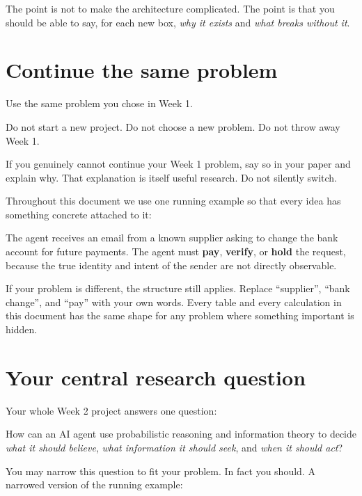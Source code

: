 \documentclass[11pt,a4paper]{article}
\begin{document}
The point is not to make the architecture complicated. The point is that you should be able
to say, for each new box, \emph{why it exists} and \emph{what breaks without it}.

\section{Continue the same problem}

Use the same problem you chose in Week 1.

Do not start a new project. Do not choose a new problem. Do not throw away Week 1.

If you genuinely cannot continue your Week 1 problem, say so in your paper and explain why.
That explanation is itself useful research. Do not silently switch.

Throughout this document we use one running example so that every idea has something concrete
attached to it:

\begin{sbrule}
The agent receives an email from a known supplier asking to change the bank account for
future payments. The agent must \textbf{pay}, \textbf{verify}, or \textbf{hold} the request, because the true
identity and intent of the sender are not directly observable.
\end{sbrule}

If your problem is different, the structure still applies. Replace ``supplier'', ``bank change'',
and ``pay'' with your own words. Every table and every calculation in this document has the same
shape for any problem where something important is hidden.

\section{Your central research question}
\label{sec:question}

Your whole Week 2 project answers one question:

\begin{sbrule}
How can an AI agent use probabilistic reasoning and information theory to decide
\emph{what it should believe}, \emph{what information it should seek}, and \emph{when it should act}?
\end{sbrule}

You may narrow this question to fit your problem. In fact you should. A narrowed version of
the running example:
\end{document}

